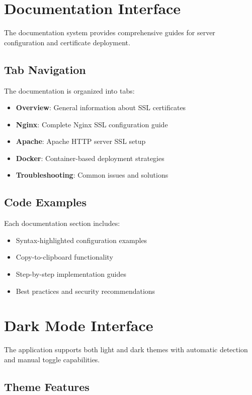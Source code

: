 \section{Documentation Interface}

The documentation system provides comprehensive guides for server configuration and certificate deployment.

\subsection{Tab Navigation}

The documentation is organized into tabs:
\begin{itemize}
    \item \textbf{Overview}: General information about SSL certificates
    \item \textbf{Nginx}: Complete Nginx SSL configuration guide
    \item \textbf{Apache}: Apache HTTP server SSL setup
    \item \textbf{Docker}: Container-based deployment strategies
    \item \textbf{Troubleshooting}: Common issues and solutions
\end{itemize}

\subsection{Code Examples}

Each documentation section includes:
\begin{itemize}
    \item Syntax-highlighted configuration examples
    \item Copy-to-clipboard functionality
    \item Step-by-step implementation guides
    \item Best practices and security recommendations
\end{itemize}

\section{Dark Mode Interface}

The application supports both light and dark themes with automatic detection and manual toggle capabilities.

\subsection{Theme Features}

